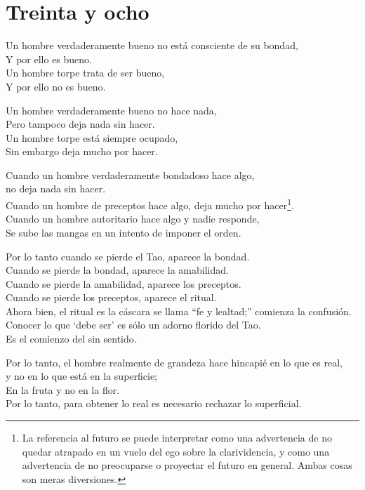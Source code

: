 \documentclass[book,b5paper,hidelinks,final]{memoir}
\begin{document}
	\chapter*{Treinta y ocho}
	
	Un hombre verdaderamente bueno no está consciente de su bondad,\\
	Y por ello es bueno.\\
	Un hombre torpe trata de ser bueno,\\
	Y por ello no es bueno.
	
	Un hombre verdaderamente bueno no hace nada,\\
	Pero tampoco deja nada sin hacer.\\
	Un hombre torpe está siempre ocupado,\\
	Sin embargo deja mucho por hacer.
	
	Cuando un hombre verdaderamente bondadoso hace algo,\\
	no deja nada sin hacer.\\
	Cuando un hombre de preceptos hace algo, deja mucho por hacer\footnote{La referencia al futuro se puede interpretar como una advertencia de no
		quedar atrapado en un vuelo del ego sobre la clarividencia, y como una
		advertencia de no preocuparse o proyectar el futuro en general. Ambas
		cosas son meras diversiones.}.\\
	Cuando un hombre autoritario hace algo y nadie responde,\\
	Se sube las mangas en un intento de imponer el orden.
	
	Por lo tanto cuando se pierde el Tao, aparece la bondad.\\
	Cuando se pierde la bondad, aparece la amabilidad.\\
	Cuando se pierde la amabilidad, aparece los preceptos.\\
	Cuando se pierde los preceptos, aparece el ritual.\\
	Ahora bien, el ritual es la cáscara se llama ``fe y lealtad;'' comienza
	la confusión.\\
	Conocer lo que `debe ser' es sólo un adorno florido del Tao.\\
	Es el comienzo del sin sentido.
	
	Por lo tanto, el hombre realmente de grandeza hace hincapié en lo que es
	real,\\
	y no en lo que está en la superficie;\\
	En la fruta y no en la flor.\\
	Por lo tanto, para obtener lo real es necesario rechazar lo superficial.
	
\end{document}

